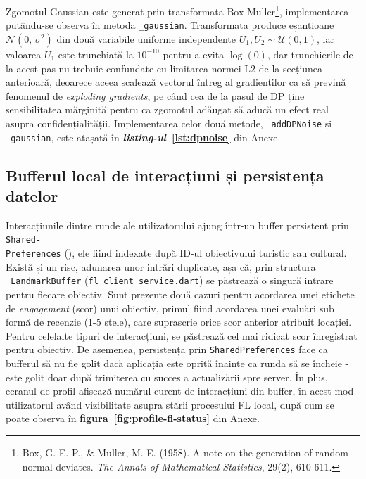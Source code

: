 \documentclass[12pt,a4paper]{report}
\begin{document}
Zgomotul Gaussian este generat prin transformata Box-Muller\footnote{Box, G. E. P., \& Muller, M. E. (1958). A note on the generation of random normal deviates. \textit{The Annals of Mathematical Statistics}, 29(2), 610-611.}, implementarea putându-se observa în metoda \texttt{\_gaussian}. Transformata produce eșantioane $\mathcal{N}(0,\,\sigma^2)$ din două variabile uniforme independente $U_1, U_2 \sim \mathcal{U}(0,1)$, iar valoarea $U_1$ este trunchiată la $10^{-10}$ pentru a evita $\log(0)$, dar trunchierile de la acest pas nu trebuie confundate cu limitarea normei L2 de la secțiunea anterioară, deoarece aceea scalează vectorul întreg al gradienților ca să prevină fenomenul de \textit{exploding gradients}, pe când cea de la pasul de DP ține sensibilitatea mărginită pentru ca zgomotul adăugat să aducă un efect real asupra confidențialității. Implementarea celor două metode, \texttt{\_addDPNoise} și \texttt{\_gaussian}, este atașată în \textbf{\textit{listing-ul}~\ref{lst:dpnoise}} din Anexe.

\subsection{Bufferul local de interacțiuni și persistența datelor}

Interacțiunile dintre runde ale utilizatorului ajung într-un buffer persistent prin \texttt{Shared-\\Preferences} (), ele fiind indexate după ID-ul obiectivului turistic sau cultural. Există și un risc, adunarea unor intrări duplicate, așa că, prin structura \texttt{\_LandmarkBuffer} (\texttt{fl\_client\_service.dart}) se păstrează o singură intrare pentru fiecare obiectiv. Sunt prezente două cazuri pentru acordarea unei etichete de \textit{engagement} (scor) unui obiectiv, primul fiind acordarea unei evaluări sub formă de recenzie (1-5 stele), care suprascrie orice scor anterior atribuit locației. Pentru celelalte tipuri de interacțiuni, se păstrează cel mai ridicat scor înregistrat pentru obiectiv. De asemenea, persistența prin \texttt{SharedPreferences} face ca bufferul să nu fie golit dacă aplicația este oprită înainte ca runda să se încheie - este golit doar după trimiterea cu succes a actualizării spre server. În plus, ecranul de profil afișează numărul curent de interacțiuni din buffer, în acest mod utilizatorul având vizibilitate asupra stării procesului FL local, după cum se poate observa în \textbf{figura~\ref{fig:profile-fl-status}} din Anexe.
\end{document}
